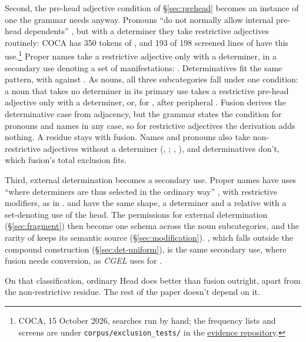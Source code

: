 \documentclass[12pt]{article}
\begin{document}
Second, the pre-head adjective condition of §\ref{sec:prehead} becomes an instance of one the grammar needs anyway. Pronouns \enquote{do not normally allow internal pre-head dependents} \citep[430]{huddleston2002}, but with a determiner they take restrictive adjectives routinely: COCA has 350 tokens of , and 193 of 198 screened lines of  have this use.\footnote{COCA, 15 October 2026, searches run by hand; the frequency lists and screens are under \texttt{corpus/exclusion\_tests/} in the \href{https://github.com/BrettRey/determinatives-as-nouns}{evidence repository}.} Proper names take a restrictive adjective only with a determiner, in a secondary use denoting a set of manifestations:  \citep[520--521]{huddleston2002}. Determinatives fit the same pattern, with  against . As nouns, all three subcategories fall under one condition: a noun that takes no determiner in its primary use takes a restrictive pre-head adjective only with a determiner, or, for , after peripheral . Fusion derives the determinative case from adjacency, but the grammar states the condition for pronouns and names in any case, so for restrictive adjectives the derivation adds nothing. A residue stays with fusion. Names and pronouns also take non-restrictive adjectives without a determiner (, \citealp[521]{huddleston2002}; , \citealp[430]{huddleston2002}), and determinatives don't, which fusion's total exclusion fits.

Third, external determination becomes a secondary use. Proper names have uses \enquote{where determiners are thus selected in the ordinary way} \citep[520]{huddleston2002}, with restrictive modifiers, as in .  and  have the same shape, a determiner and a relative with a set-denoting use of the head. The permissions for external determination (§\ref{sec:fragment}) then become one schema across the noun subcategories, and the rarity of  keeps its semantic source (§\ref{sec:modification}). , which falls outside the compound construction (§\ref{sec:det-uniform}), is the same secondary use, where fusion needs conversion, as \textit{CGEL} uses for  \citep[423 n.~43]{huddleston2002}.

On that classification, ordinary Head does better than fusion outright, apart from the non-restrictive residue. The rest of the paper doesn't depend on it.
\end{document}
